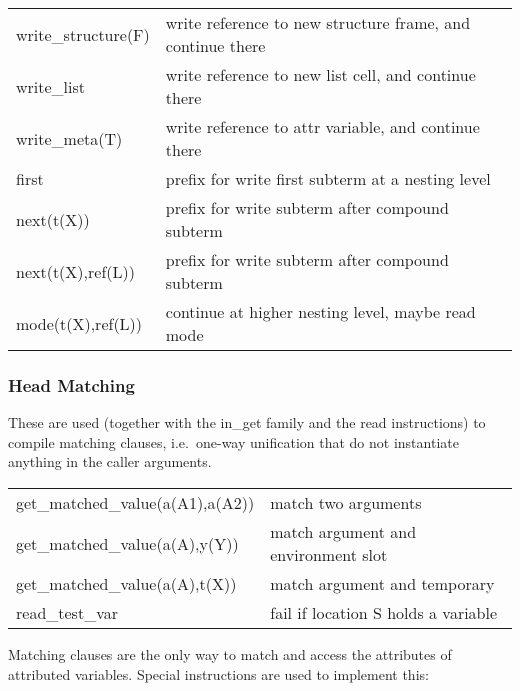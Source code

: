 \begin{tabular}{|p{}|p{}|}
\hline
write_structure(F)              & write reference to new structure frame, and continue there \\
write_list                      & write reference to new list cell, and continue there \\
write_meta(T)                   & write reference to attr variable, and continue there \\
\hline
first                           & prefix for write first subterm at a nesting level \\
next(t(X))                      & prefix for write subterm after compound subterm \\
next(t(X),ref(L))               & prefix for write subterm after compound subterm \\
mode(t(X),ref(L))               & continue at higher nesting level, maybe read mode \\
\hline
\end{tabular}


\subsubsection{Head Matching}
These are used (together with the in_get family and the read
instructions) to compile matching clauses, i.e.\ one-way unification
that do not instantiate anything in the caller arguments.

\begin{tabular}{|p{}|p{}|}
\hline
get_matched_value(a(A1),a(A2))  & match two arguments \\
get_matched_value(a(A),y(Y))    & match argument and environment slot \\
get_matched_value(a(A),t(X))    & match argument and temporary \\
read_test_var                   & fail if location S holds a variable \\
\hline
\end{tabular}

Matching clauses are the only way to match and access the attributes of
attributed variables. Special instructions are used to implement this:


